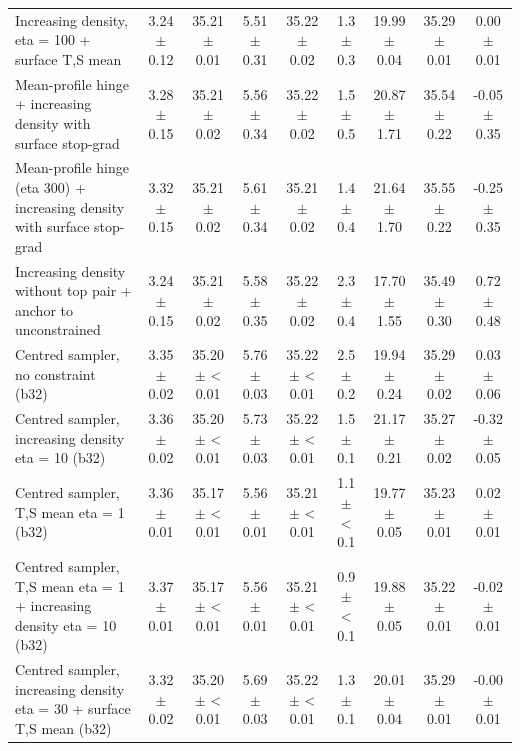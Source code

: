 \begin{tabular}{lcccccccc}
Increasing density, eta = 100 + surface T,S mean & 3.24 $\pm$ 0.12 & 35.21 $\pm$ 0.01 & 5.51 $\pm$ 0.31 & 35.22 $\pm$ 0.02 & 1.3 $\pm$ 0.3 & 19.99 $\pm$ 0.04 & 35.29 $\pm$ 0.01 & 0.00 $\pm$ 0.01 \\
Mean-profile hinge + increasing density with surface stop-grad & 3.28 $\pm$ 0.15 & 35.21 $\pm$ 0.02 & 5.56 $\pm$ 0.34 & 35.22 $\pm$ 0.02 & 1.5 $\pm$ 0.5 & 20.87 $\pm$ 1.71 & 35.54 $\pm$ 0.22 & -0.05 $\pm$ 0.35 \\
Mean-profile hinge (eta 300) + increasing density with surface stop-grad & 3.32 $\pm$ 0.15 & 35.21 $\pm$ 0.02 & 5.61 $\pm$ 0.34 & 35.21 $\pm$ 0.02 & 1.4 $\pm$ 0.4 & 21.64 $\pm$ 1.70 & 35.55 $\pm$ 0.22 & -0.25 $\pm$ 0.35 \\
Increasing density without top pair + anchor to unconstrained & 3.24 $\pm$ 0.15 & 35.21 $\pm$ 0.02 & 5.58 $\pm$ 0.35 & 35.22 $\pm$ 0.02 & 2.3 $\pm$ 0.4 & 17.70 $\pm$ 1.55 & 35.49 $\pm$ 0.30 & 0.72 $\pm$ 0.48 \\
Centred sampler, no constraint (b32) & 3.35 $\pm$ 0.02 & 35.20 $\pm$ < 0.01 & 5.76 $\pm$ 0.03 & 35.22 $\pm$ < 0.01 & 2.5 $\pm$ 0.2 & 19.94 $\pm$ 0.24 & 35.29 $\pm$ 0.02 & 0.03 $\pm$ 0.06 \\
Centred sampler, increasing density eta = 10 (b32) & 3.36 $\pm$ 0.02 & 35.20 $\pm$ < 0.01 & 5.73 $\pm$ 0.03 & 35.22 $\pm$ < 0.01 & 1.5 $\pm$ 0.1 & 21.17 $\pm$ 0.21 & 35.27 $\pm$ 0.02 & -0.32 $\pm$ 0.05 \\
Centred sampler, T,S mean eta = 1 (b32) & 3.36 $\pm$ 0.01 & 35.17 $\pm$ < 0.01 & 5.56 $\pm$ 0.01 & 35.21 $\pm$ < 0.01 & 1.1 $\pm$ < 0.1 & 19.77 $\pm$ 0.05 & 35.23 $\pm$ 0.01 & 0.02 $\pm$ 0.01 \\
Centred sampler, T,S mean eta = 1 + increasing density eta = 10 (b32) & 3.37 $\pm$ 0.01 & 35.17 $\pm$ < 0.01 & 5.56 $\pm$ 0.01 & 35.21 $\pm$ < 0.01 & 0.9 $\pm$ < 0.1 & 19.88 $\pm$ 0.05 & 35.22 $\pm$ 0.01 & -0.02 $\pm$ 0.01 \\
Centred sampler, increasing density eta = 30 + surface T,S mean (b32) & 3.32 $\pm$ 0.02 & 35.20 $\pm$ < 0.01 & 5.69 $\pm$ 0.03 & 35.22 $\pm$ < 0.01 & 1.3 $\pm$ 0.1 & 20.01 $\pm$ 0.04 & 35.29 $\pm$ 0.01 & -0.00 $\pm$ 0.01 \\
\bottomrule
\end{tabular}
